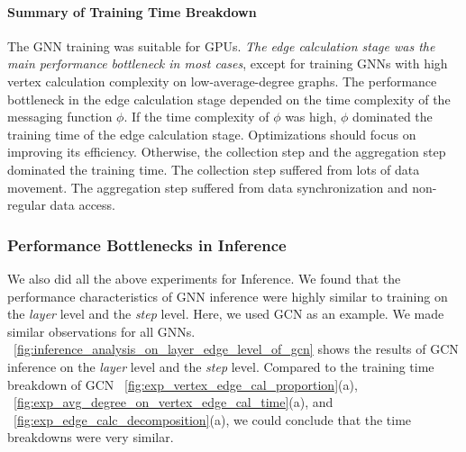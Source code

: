 \paragraph{Summary of Training Time Breakdown}
%
The GNN training was suitable for GPUs.
%
\emph{The edge calculation stage was the main performance bottleneck in most cases}, except for training GNNs with high vertex calculation complexity on low-average-degree graphs.
%
The performance bottleneck in the edge calculation stage depended on the time complexity of the messaging function $\phi$.
%
If the time complexity of $\phi$ was {high}, {$\phi$} dominated the training time of the edge calculation stage.
%
Optimizations should focus on improving its efficiency.
%
Otherwise, the {collection step} and the {aggregation step} dominated the training time.
%
The collection step suffered from lots of data movement.
%
The aggregation step suffered from data synchronization and non-regular data access.


\subsubsection{Performance Bottlenecks in Inference}
%
We also did all the above experiments for Inference.
%
We found that the performance characteristics of GNN inference were highly similar to training on the \emph{layer} level and the \emph{step} level.
%
Here, we used GCN as an example. 
%
We made similar observations for all GNNs. 
%
\figurename~\ref{fig:inference_analysis_on_layer_edge_level_of_gcn} shows the results of GCN inference on the \emph{layer} level and the \emph{step} level.
%
Compared to the training time breakdown of GCN \figurename~\ref{fig:exp_vertex_edge_cal_proportion}(a), 
\figurename~\ref{fig:exp_avg_degree_on_vertex_edge_cal_time}(a), and \figurename~\ref{fig:exp_edge_calc_decomposition}(a),
we could conclude that the time breakdowns were very similar.

